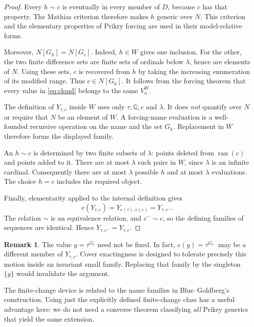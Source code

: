 \documentclass[11pt,letterpaper]{article}
\theoremstyle{definition}
\newcommand{\ran}{\operatorname{ran}}
\newcommand{\QQ}{\mathbb Q}
\newtheorem{remark}[definition]{Remark}
\begin{document}
\begin{proof}
Every $h\sim c$ is eventually in every member of $D$, because $c$ has
that property. The Mathias criterion therefore makes $h$ generic over
$N$. This criterion and the elementary properties of Prikry forcing are
used in their model-relative forms.\cite[proof of Theorem~5.4]{abgl}

Moreover, $N[G_h]=N[G_c]$. Indeed, $h\in W$ gives one inclusion.
For the other, the two finite difference sets are finite sets of
ordinals below $\lambda$, hence are elements of $N$. Using these sets,
$c$ is recovered from $h$ by taking the increasing enumeration of its
modified range. Thus $c\in N[G_h]$.
It follows from the forcing theorem that every value in \eqref{eq:cloud}
belongs to the same $V_\alpha^W$.

The definition of $Y_{\tau,c}$ inside $W$ uses only $\tau,\QQ,c$ and
$\lambda$. It does \emph{not} quantify over $N$ or require that $N$ be
an element of $W$. A forcing-name evaluation is a well-founded recursive
operation on the name and the set $G_h$. Replacement in $W$ therefore
forms the displayed family.

An $h\sim c$ is determined by two finite subsets of $\lambda$: points
deleted from $\ran(c)$ and points added to it. There are at most
$\lambda$ such pairs in $W$, since $\lambda$ is an infinite cardinal.
Consequently there are at most $\lambda$ possible $h$ and at most
$\lambda$ evaluations. The choice $h=c$ includes the required object.

Finally, elementarity applied to the internal definition gives
\[
 e(Y_{\tau,c})=Y_{e(\tau),e(c)}=Y_{\tau,c^-}.
\]
The relation $\sim$ is an equivalence relation, and $c^-\sim c$, so the
defining families of sequences are identical. Hence
$Y_{\tau,c^-}=Y_{\tau,c}$.
\end{proof}

\begin{remark}
The value $y=\tau^{G_c}$ need not be fixed. In fact,
$e(y)=\tau^{G_{c^-}}$ may be a different member of $Y_{\tau,c}$.
Cover exactingness is designed to tolerate precisely this motion inside
an invariant small family. Replacing that family by the singleton
$\{y\}$ would invalidate the argument.
\end{remark}

The finite-change device is related to the name families in
Blue--Goldberg's construction.\cite[proof of Theorem~3.5]{cover}
Using just the explicitly defined finite-change class has a useful
advantage here: we do not need a converse theorem classifying
\emph{all} Prikry generics that yield the same extension.
\end{document}
